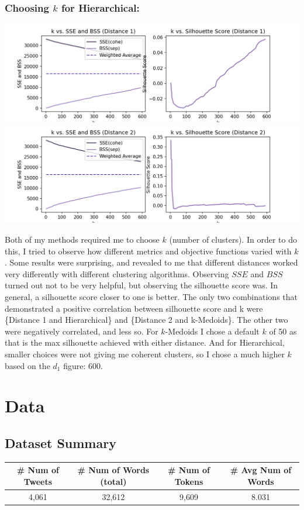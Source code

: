 \documentclass[fleqn]{article}
\begin{document}
\subsubsection{Choosing $k$ for Hierarchical:}
\begin{center}
    \includegraphics[scale=0.40]{images/d1_f_ks.png}\includegraphics[scale=0.40]{images/d2_f_ks.png}
\end{center}
Both of my methods required me to choose $k$ (number of clusters).  In order to do this, I tried to observe how different metrics and objective functions varied with $k$.  Some results were surprising, and revealed to me that different distances worked very differently with different clustering algorithms.  Observing $SSE$ and $BSS$ turned out not to be very helpful, but observing the silhouette score was.  In general, a silhouette score closer to one is better.  The only two combinations that demonstrated a positive correlation between silhouette score and k were \{Distance 1 and Hierarchical\} and \{Distance 2 and k-Medoids\}. The other two were negatively correlated, and less so.  For $k$-Medoids I chose a default $k$ of 50 as that is the max silhouette achieved with either distance.  And for Hierarchical, smaller choices were not giving me coherent clusters, so I chose a much higher $k$ based on the $d_1$ figure: 600.
\section{Data}
\subsection{Dataset Summary}
\begin{tabular}{|c|c|c|c|}
    \hline
    \textbf{\# Num of Tweets} & \textbf{\# Num of Words (total)} & \textbf{\# Num of Tokens} & \textbf{\# Avg Num of Words}\\
    \hline
    4,061&32,612&9,609&8.031\\
    \hline
\end{tabular}
\end{document}
